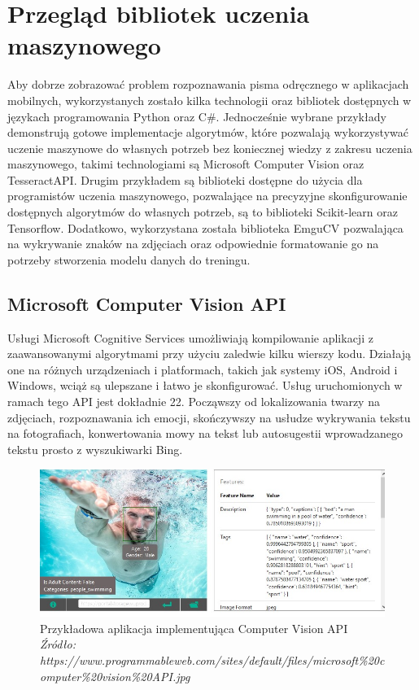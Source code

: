 \documentclass[brudnopis]{xmgr}
\begin{document}
\chapter{Przegląd bibliotek uczenia maszynowego}
Aby dobrze zobrazować problem rozpoznawania pisma odręcznego w aplikacjach mobilnych, wykorzystanych zostało kilka technologii oraz bibliotek dostępnych w językach programowania Python oraz C\#. Jednocześnie wybrane przykłady demonstrują gotowe implementacje algorytmów, które pozwalają wykorzystywać uczenie maszynowe do własnych potrzeb bez koniecznej wiedzy z zakresu uczenia maszynowego, takimi technologiami są Microsoft Computer Vision\cite{9} oraz TesseractAPI\cite{10}. Drugim przykładem są biblioteki dostępne do użycia dla programistów uczenia maszynowego, pozwalające na precyzyjne skonfigurowanie dostępnych algorytmów do własnych potrzeb, są to biblioteki Scikit-learn oraz Tensorflow. Dodatkowo, wykorzystana została biblioteka EmguCV pozwalająca na wykrywanie znaków na zdjęciach oraz odpowiednie formatowanie go na potrzeby stworzenia modelu danych do treningu.

\section{Microsoft Computer Vision API}

Usługi Microsoft Cognitive Services\cite{9} umożliwiają kompilowanie aplikacji z zaawansowanymi algorytmami przy użyciu zaledwie kilku wierszy kodu. Działają one na różnych urządzeniach i platformach, takich jak systemy iOS, Android i Windows, wciąż są ulepszane i łatwo je skonfigurować. Usług uruchomionych w ramach tego API jest dokładnie 22. Począwszy od lokalizowania twarzy na zdjęciach, rozpoznawania ich emocji, skończywszy na usłudze wykrywania tekstu na fotografiach, konwertowania mowy na tekst lub autosugestii wprowadzanego tekstu prosto z wyszukiwarki Bing.

\begin{figure}[!tbh]
\centering
\includegraphics[width=.8\hsize]{fig/mscvapi}
\caption{Przykładowa aplikacja implementująca Computer Vision API \emph{Źródło: https://www.programmableweb.com/sites/default/files/microsoft\%20computer\%20vision\%20API.jpg}}
\end{figure}
\newpage
\end{document}
